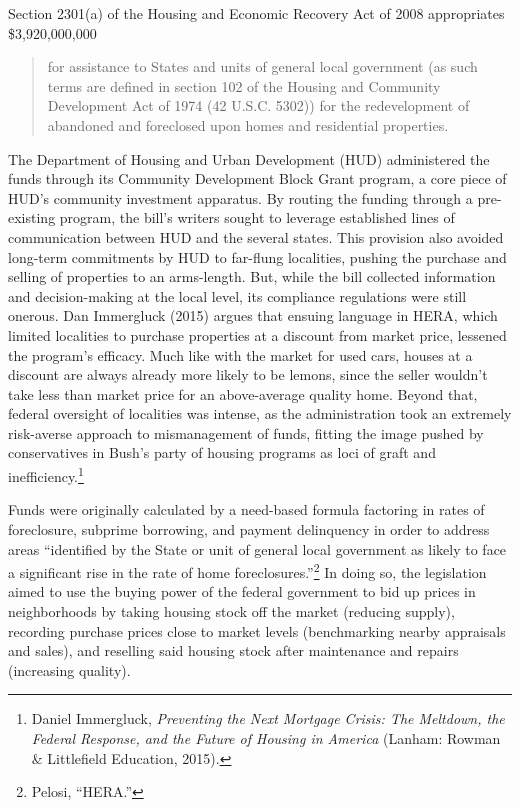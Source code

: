 \documentclass[12pt,oneside]{psthesis}
\begin{document}
Section 2301(a) of the Housing and Economic Recovery Act of 2008 appropriates \$3,920,000,000
\begin{quote}
for assistance to States and units of general local government (as such terms are defined in section 102 of the Housing and Community Development Act of 1974 (42 U.S.C. 5302)) for the redevelopment of abandoned and foreclosed upon homes and residential properties.
\end{quote}
The Department of Housing and Urban Development (HUD) administered the funds through its Community Development Block Grant program, a core piece of HUD's community investment apparatus.
By routing the funding through a pre-existing program, the bill's writers sought to leverage established lines of communication between HUD and the several states.
This provision also avoided long-term commitments by HUD to far-flung localities, pushing the purchase and selling of properties to an arms-length.
But, while the bill collected information and decision-making at the local level, its compliance regulations were still onerous.
Dan Immergluck (2015) argues that ensuing language in HERA, which limited localities to purchase properties at a discount from market price, lessened the program's efficacy.
Much like with the market for used cars, houses at a discount are always already more likely to be lemons, since the seller wouldn't take less than market price for an above-average quality home.
Beyond that, federal oversight of localities was intense, as the administration took an extremely risk-averse approach to mismanagement of funds, fitting the image pushed by conservatives in Bush's party of housing programs as loci of graft and inefficiency.\footnote{Daniel Immergluck, \emph{Preventing the Next Mortgage Crisis: The Meltdown, the Federal Response, and the Future of Housing in America} (Lanham: Rowman \& Littlefield Education, 2015).}

Funds were originally calculated by a need-based formula factoring in rates of foreclosure, subprime borrowing, and payment delinquency in order to address areas ``identified by the State or unit of general local government as likely to face a significant rise in the rate of home foreclosures.''\footnote{Pelosi, ``HERA.''}
In doing so, the legislation aimed to use the buying power of the federal government to bid up prices in neighborhoods by taking housing stock off the market (reducing supply), recording purchase prices close to market levels (benchmarking nearby appraisals and sales), and reselling said housing stock after maintenance and repairs (increasing quality).
\end{document}
